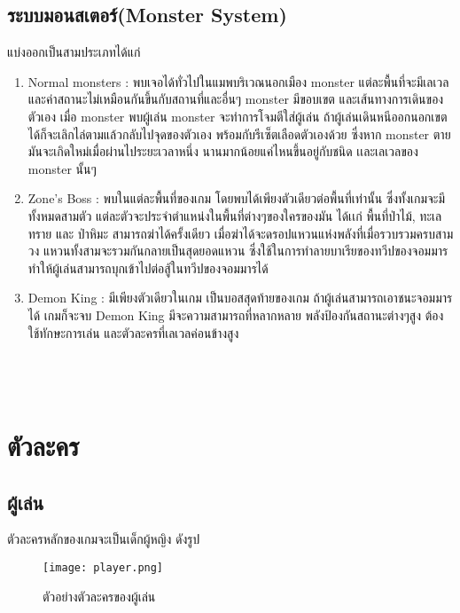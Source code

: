 \subsection{ระบบมอนสเตอร์(Monster System)}
แบ่งออกเป็นสามประเภทได้แก่
\begin{enumerate}
\item Normal monsters : พบเจอได้ทั่วไปในแมพบริเวณนอกเมือง monster แต่ละพื้นที่จะมีเลเวล และค่าสถานะไม่เหมือนกันขึ้นกับสถานที่และอื่นๆ monster มีขอบเขต และเส้นทางการเดินของตัวเอง เมื่อ monster พบผู้เล่น monster จะทำการโจมตีใส่ผู้เล่น ถ้าผู้เล่นเดินหนีออกนอกเขตได้ก็จะเลิกไล่ตามแล้วกลับไปจุดของตัวเอง พร้อมกับรีเซ็ตเลือดตัวเองด้วย ซึ่งหาก monster ตายมันจะเกิดใหม่เมื่อผ่านไประยะเวลาหนึ่ง นานมากน้อยแค่ไหนขึ้นอยู่กับชนิด เเละเลเวลของ monster นั้นๆ
\item Zone’s Boss : พบในแต่ละพื้นที่ของเกม โดยพบได้เพียงตัวเดียวต่อพื้นที่เท่านั้น ซึ่งทั้งเกมจะมีทั้งหมดสามตัว แต่ละตัวจะประจำตำแหน่งในพื้นที่ต่างๆของใครของมัน ได้เเก่ พื้นที่ป่าไม้, ทะเลทราย และ ป่าหิมะ สามารถฆ่าได้ครั้งเดียว เมื่อฆ่าได้จะดรอปแหวนแห่งพลังที่เมื่อรวบรวมครบสามวง แหวนทั้งสามจะรวมกันกลายเป็นสุดยอดแหวน ซึ่งใช้ในการทำลายบาเรียของทวีปของจอมมาร ทำให้ผู้เล่นสามารถบุกเข้าไปต่อสู้ในทวีปของจอมมารได้
\item Demon King : มีเพียงตัวเดียวในเกม เป็นบอสสุดท้ายของเกม ถ้าผู้เล่นสามารถเอาชนะจอมมารได้ เกมก็จะจบ Demon King มีจะความสามารถที่หลากหลาย พลังป้องกันสถานะต่างๆสูง ต้องใช้ทักษะการเล่น และตัวละครที่เลเวลค่อนข้างสูง
\\
\\
\\
\\
\end{enumerate}


\section{ตัวละคร}
\subsection{ผู้เล่น}
ตัวละครหลักของเกมจะเป็นเด็กผู้หญิง ดังรูป
\begin{figure}[htbp]
  \centering 
  \texttt{[image: player.png]}
  \caption[player]{ตัวอย่างตัวละครของผู้เล่น}
  \label{fig:player}
\end{figure}


